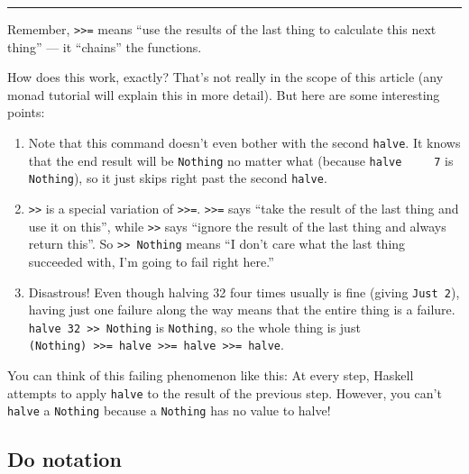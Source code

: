 \documentclass[]{article}
\begin{document}
\begin{center}\rule{0.5\linewidth}{0.5pt}\end{center}

Remember, \texttt{\textgreater{}\textgreater{}=} means ``use the results of the
last thing to calculate this next thing'' --- it ``chains'' the functions.

How does this work, exactly? That's not really in the scope of this article (any
monad tutorial will explain this in more detail). But here are some interesting
points:

\begin{enumerate}
\def\labelenumi{\arabic{enumi}.}
\tightlist
\item
  Note that this command doesn't even bother with the second \texttt{halve}. It
  knows that the end result will be \texttt{Nothing} no matter what (because
  \texttt{halve\ \ \ \ \ 7} is \texttt{Nothing}), so it just skips right past
  the second \texttt{halve}.
\item
  \texttt{\textgreater{}\textgreater{}} is a special variation of
  \texttt{\textgreater{}\textgreater{}=}. \texttt{\textgreater{}\textgreater{}=}
  says ``take the result of the last thing and use it on this'', while
  \texttt{\textgreater{}\textgreater{}} says ``ignore the result of the last
  thing and always return this''. So
  \texttt{\textgreater{}\textgreater{}\ Nothing} means ``I don't care what the
  last thing succeeded with, I'm going to fail right here.''
\item
  Disastrous! Even though halving 32 four times usually is fine (giving
  \texttt{Just\ 2}), having just one failure along the way means that the entire
  thing is a failure. \texttt{halve\ 32\ \textgreater{}\textgreater{}\ Nothing}
  is \texttt{Nothing}, so the whole thing is just
  \texttt{(Nothing)\ \textgreater{}\textgreater{}=\ halve\ \textgreater{}\textgreater{}=\ halve\ \textgreater{}\textgreater{}=\ halve}.
\end{enumerate}

You can think of this failing phenomenon like this: At every step, Haskell
attempts to apply \texttt{halve} to the result of the previous step. However,
you can't \texttt{halve} a \texttt{Nothing} because a \texttt{Nothing} has no
value to halve!

\subsection{Do notation}\label{do-notation}
\end{document}
